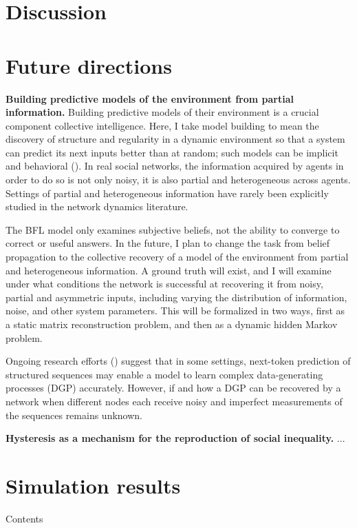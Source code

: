 \documentclass[]{article}
\begin{document}
\section{Discussion}

\newpage

\section{Future directions}

\textbf{Building predictive models of the environment from partial information.} Building predictive models of their environment is a crucial component collective intelligence. Here, I take model building to mean the discovery of structure and regularity in a dynamic environment so that a system can predict its next inputs better than at random; such models can be implicit and behavioral (\cite{crutchfieldCalculiEmergenceComputation1994}). In real social networks, the information acquired by agents in order to do so is not only noisy, it is also partial and heterogeneous across agents. Settings of partial and heterogeneous information have rarely been explicitly studied in the network dynamics literature.

The BFL model only examines subjective beliefs, not the ability to converge to correct or useful answers. In the future, I plan to change the task from belief propagation to the collective recovery of a model of the environment from partial and heterogeneous information. A ground truth will exist, and I will examine under what conditions the network is successful at recovering it from noisy, partial and asymmetric inputs, including varying the distribution of information, noise, and other system parameters. This will be formalized in two ways, first as a static matrix reconstruction problem, and then as a dynamic hidden Markov problem.

Ongoing research efforts (\cite{malachAutoRegressiveNextTokenPredictors2023}) suggest that in some settings, next-token prediction of structured sequences may enable a model to learn complex data-generating processes (DGP) accurately. However, if and how a DGP can be recovered by a network when different nodes each receive noisy and imperfect measurements of the sequences remains unknown.

\textbf{Hysteresis as a mechanism for the reproduction of social inequality.} ...

\printbibliography[heading=bibintoc, title={References}]



\appendix

\section{Simulation results}

Contents
\end{document}
